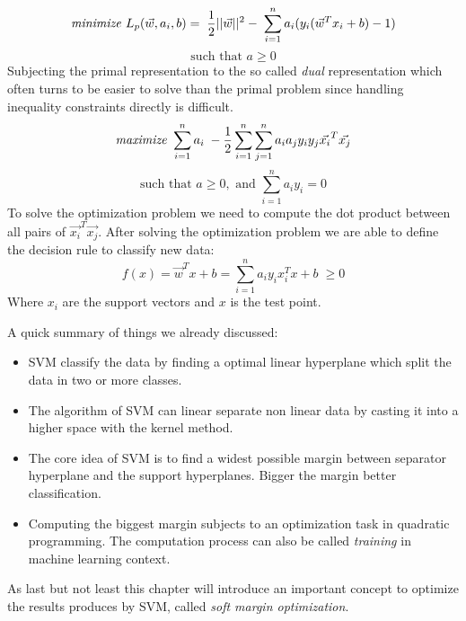 \[\textrm{\textit{minimize} } L_p(\vec{w},a_i,b) = \; \frac{1}{2}||\vec{w}||^2 - \; \sum_{i=1}^{n} a_i(y_i(\vec{w}^T x_i +b) - 1) \]
\[\textrm{such that } a \geq 0 \]
Subjecting the primal representation to the so called \textit{dual} representation which often turns to be easier to solve than the primal problem since handling inequality constraints directly is difficult.
\[\textrm{\textit{maximize} }  \sum_{i=1}^{n} a_i \; - \frac{1}{2}\sum_{i=1}^{n}\sum_{j=1}^{n}a_i a_j y_i y_j \vec{x_i}^T \vec{x_j} \]
\[\textrm{such that } a \geq 0, \textrm{ and } \sum_{i=1}^{n}a_i y_i = 0  \]
To solve the optimization problem we need to compute the dot product between all pairs of \(\vec{x_i}^T \vec{x_j}\). After solving the optimization problem we are able to define the decision rule to classify new data:
\[  f(x) = \vec{w}^T x + b = \sum_{i=1}^{n}a_i y_i x_i^T x + b \; \geq 0  \]
Where \(x_i\) are the support vectors and \(x\) is the test point. \newline

A quick summary of things we already discussed:
\begin{itemize}
    \item SVM classify the data by finding a optimal linear hyperplane which split the data in two or more classes.
    
    \item The algorithm of SVM can linear separate non linear data by casting it into a higher space with the kernel method.
    
    \item The core idea of SVM is to find a widest possible margin between separator hyperplane and the support hyperplanes. Bigger the margin better classification.
    
    \item Computing the biggest margin subjects to an optimization task in quadratic programming. The computation process can also be called \textit{training} in machine learning context.
\end{itemize}

As last but not least this chapter will introduce an important concept to optimize the results produces by SVM, called \textit{soft margin optimization}.

